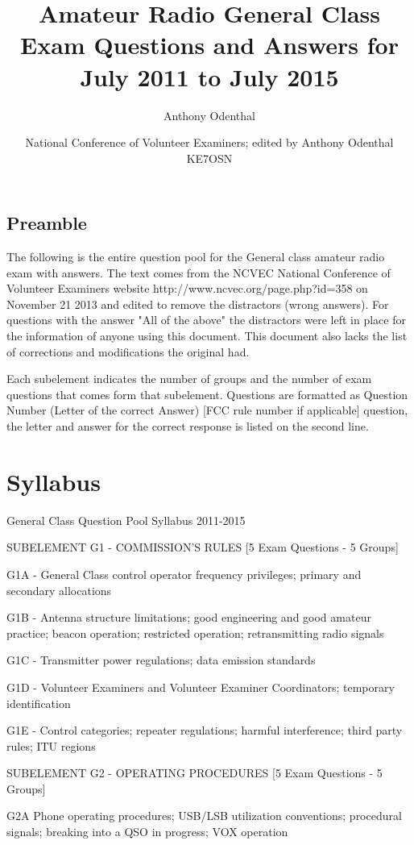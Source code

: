 \documentclass[12pt,letterpaper]{report}
\author{Anthony Odenthal}
\author{National Conference of Volunteer Examiners; edited by Anthony Odenthal KE7OSN}
\title{Amateur Radio General Class Exam Questions and Answers for July 2011 to July 2015}
\begin{document}
\maketitle
\section{Preamble}
The following is the entire question pool for the General class amateur radio exam with answers. The text comes from the NCVEC National Conference of Volunteer Examiners website http://www.ncvec.org/page.php?id=358 on November 21 2013 and edited to remove the distractors (wrong answers). For questions with the answer "All of the above" the distractors were left in place for the information of anyone using this document. This document also lacks the list of corrections and modifications the original had.

Each subelement indicates the number of groups and the number of exam questions that comes form that subelement. Questions are formatted as Question Number (Letter of the correct Answer) [FCC rule number if applicable] question, the letter and answer for the correct response is listed on the second line.
\tableofcontents

\chapter*{Syllabus}
General Class Question Pool Syllabus 2011-2015 


SUBELEMENT G1 - COMMISSION'S RULES [5 Exam Questions - 5 Groups]

G1A - General Class control operator frequency privileges; primary and secondary allocations

G1B - Antenna structure limitations; good engineering and good amateur practice; beacon operation; restricted operation; retransmitting radio signals

G1C - Transmitter power regulations; data emission standards

G1D - Volunteer Examiners and Volunteer Examiner Coordinators; temporary identification

G1E - Control categories; repeater regulations; harmful interference; third party rules; ITU regions

SUBELEMENT G2 - OPERATING PROCEDURES [5 Exam Questions - 5 Groups]

G2A Phone operating procedures; USB/LSB utilization conventions; procedural signals; breaking into a QSO in progress; VOX operation
\end{document}
